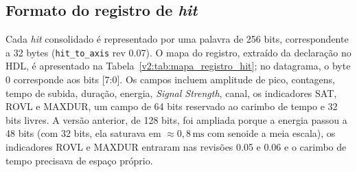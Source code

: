 \subsection{Formato do registro de \textit{hit}}
\label{v2:subsec:formato_registro_hit}

Cada \textit{hit} consolidado é representado por uma palavra de 256 bits, correspondente a 32 bytes (\texttt{hit\_to\_axis} rev 0.07). O mapa do registro, extraído da declaração no HDL, é apresentado na Tabela~\ref{v2:tab:mapa_registro_hit}; no datagrama, o byte 0 corresponde aos bits [7:0]. Os campos incluem amplitude de pico, contagens, tempo de subida, duração, energia, \textit{Signal Strength}, canal, os indicadores SAT, ROVL e MAXDUR, um campo de 64 bits reservado ao carimbo de tempo e 32 bits livres. A versão anterior, de 128 bits, foi ampliada porque a energia passou a 48 bits (com 32 bits, ela saturava em \(\approx 0{,}8\,\mathrm{ms}\) com senoide a meia escala), os indicadores ROVL e MAXDUR entraram nas revisões 0.05 e 0.06 e o carimbo de tempo precisava de espaço próprio.

